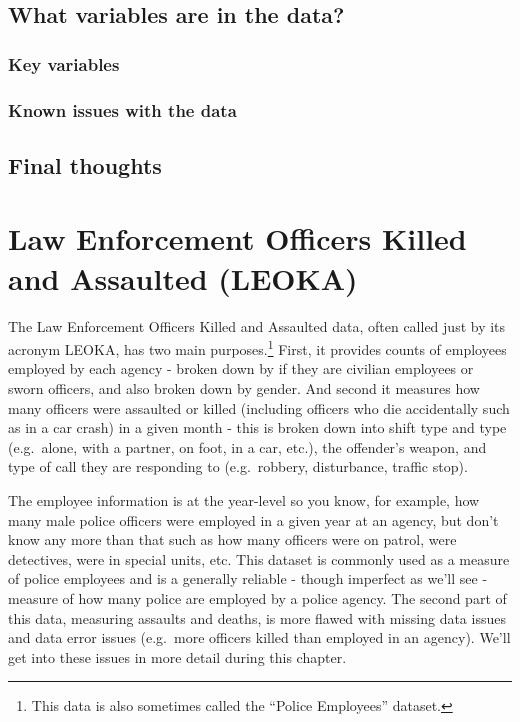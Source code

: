\documentclass[
  12pt,
  openany]{book}
\begin{document}
\hypertarget{what-variables-are-in-the-data-1}{%
\section{What variables are in the data?}\label{what-variables-are-in-the-data-1}}

\hypertarget{key-variables-1}{%
\subsection{Key variables}\label{key-variables-1}}

\hypertarget{known-issues-with-the-data-1}{%
\subsection{Known issues with the data}\label{known-issues-with-the-data-1}}

\hypertarget{final-thoughts-1}{%
\section{Final thoughts}\label{final-thoughts-1}}

\hypertarget{leoka}{%
\chapter{Law Enforcement Officers Killed and Assaulted (LEOKA)}\label{leoka}}

The Law Enforcement Officers Killed and Assaulted data, often called just by its acronym LEOKA, has two main purposes.\footnote{This data is also sometimes called the ``Police Employees'' dataset.} First, it provides counts of employees employed by each agency - broken down by if they are civilian employees or sworn officers, and also broken down by gender. And second it measures how many officers were assaulted or killed (including officers who die accidentally such as in a car crash) in a given month - this is broken down into shift type and type (e.g.~alone, with a partner, on foot, in a car, etc.), the offender's weapon, and type of call they are responding to (e.g.~robbery, disturbance, traffic stop).

The employee information is at the year-level so you know, for example, how many male police officers were employed in a given year at an agency, but don't know any more than that such as how many officers were on patrol, were detectives, were in special units, etc. This dataset is commonly used as a measure of police employees and is a generally reliable - though imperfect as we'll see - measure of how many police are employed by a police agency.
The second part of this data, measuring assaults and deaths, is more flawed with missing data issues and data error issues (e.g.~more officers killed than employed in an agency). We'll get into these issues in more detail during this chapter.
\end{document}
